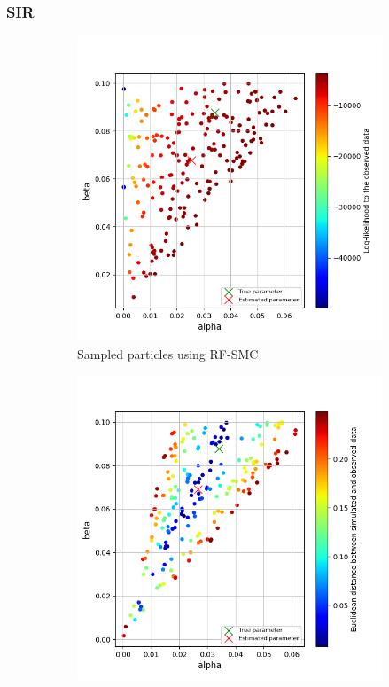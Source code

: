 \documentclass{beamer}
\begin{document}
\begin{frame}
    \frametitle{SIR}
    \begin{figure}[H]
        \centering
        \begin{subfigure}{0.4\textwidth}
            \centering
            \includegraphics[width=\linewidth]{figures/sir510_rfsmc.png}
            \caption{Sampled particles using RF-SMC}
        \end{subfigure}
        \hfill
        \begin{subfigure}{0.4\textwidth}
            \centering
            \includegraphics[width=\linewidth]{figures/sir510_abcsmc.png}

\end{subfigure}
\end{figure}
\end{frame}
\end{document}
